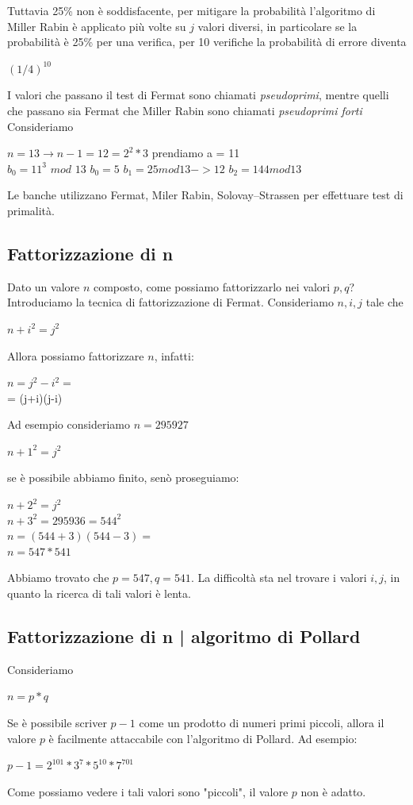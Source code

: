 \documentclass[11pt, oneside]{article}   	%
\begin{document}
Tuttavia 25\% non è soddisfacente, per mitigare la probabilità l'algoritmo di Miller Rabin è applicato più volte su $j$ valori diversi, in particolare se la probabilità è 25\% per una verifica, per 10 verifiche la probabilità di errore diventa
\begin{center}
$(1/4)^{10}$
\end{center}
I valori che passano il test di Fermat sono chiamati \emph{pseudoprimi}, mentre quelli che passano sia Fermat che Miller Rabin sono chiamati \emph{pseudoprimi forti}
Consideriamo \begin{center}
$n = 13 \rightarrow n-1 = 12 = 2^2*3$
prendiamo a = 11\\
$b_0 = 11^3$ $mod$ $13$
$b_0  = 5$
$b_1 = 25 mod 13 -> 12$
$b_2 = 144 mod 13$
\end{center}
Le banche utilizzano Fermat, Miler Rabin, Solovay–Strassen per effettuare test di primalità.


\subsection*{Fattorizzazione di n}
Dato un valore $n$ composto, come possiamo fattorizzarlo nei valori $p, q$?
Introduciamo la tecnica di fattorizzazione di Fermat. Consideriamo $n,i,j$ tale che
\begin{center}
$n+i^2 = j^2$
\end{center}
Allora possiamo fattorizzare $n$, infatti:
\begin{center}
$n = j^2 - i^2=$\\
= (j+i)(j-i)
\end{center}
Ad esempio consideriamo $n = 295927$
\begin{center}
$n+1^2 = j^2$
\end{center}
se è possibile abbiamo finito, senò proseguiamo:
\begin{center}
$n+2^2 = j^2$\\
$n+3^2 = 295936 = 544^2$\\
$n = (544+3)(544-3)=$\\
$n = 547 * 541$
\end{center}
Abbiamo trovato che $p = 547, q = 541$. La difficoltà sta nel trovare i valori $i, j$, in quanto la ricerca di tali valori è lenta.
\subsection*{Fattorizzazione di n | algoritmo di Pollard}
Consideriamo\begin{center}
$n = p * q$
\end{center}
Se è possibile scriver $p-1$ come un prodotto di numeri primi piccoli, allora il valore $p$ è facilmente attaccabile con l'algoritmo di Pollard. Ad esempio:
\begin{center}
$p-1 = 2^{101} * 3^7 * 5^{10} * 7^ {701}$
\end{center}
Come possiamo vedere i tali valori sono "piccoli", il valore $p$ non è adatto.
\end{document}
